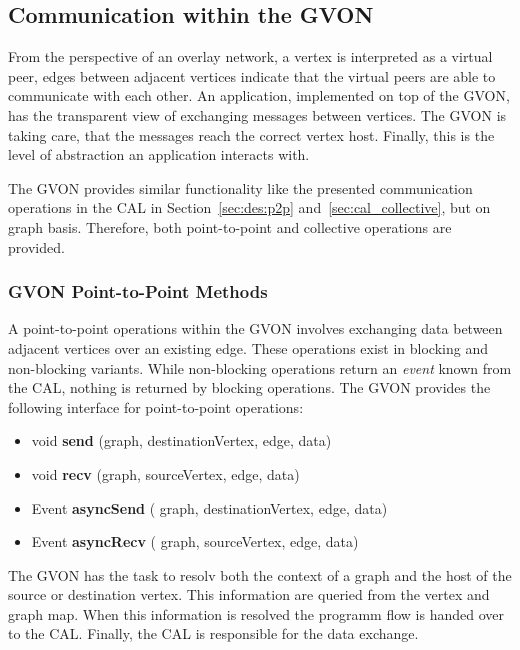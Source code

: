 \subsection{Communication within the GVON}
From the perspective of an overlay network, a vertex is interpreted as
a virtual peer, edges between adjacent vertices indicate that the
virtual peers are able to communicate with each other. An application,
implemented on top of the GVON, has the transparent view of exchanging
messages between vertices. The GVON is taking care, that the messages
reach the correct vertex host.  Finally, this is the level of
abstraction an application interacts with.

The GVON provides similar functionality like the presented
communication operations in the CAL in Section~\ref{sec:des:p2p}
and~\ref{sec:cal_collective}, but on graph basis. Therefore, both
point-to-point and collective operations are provided.

\subsubsection*{GVON Point-to-Point Methods}
A point-to-point operations within the GVON involves exchanging data
between adjacent vertices over an existing edge.  These operations
exist in blocking and non-blocking variants. While non-blocking
operations return an \emph{event} known from the CAL, nothing is returned by
blocking operations. The GVON provides the following interface for
point-to-point operations:

\begin{itemize}
  \item  void \textbf{send} (graph, destinationVertex, edge, data)
  \item  void \textbf{recv} (graph, sourceVertex, edge, data)
  \item  Event \textbf{asyncSend} ( graph, destinationVertex, edge, data)
  \item  Event \textbf{asyncRecv} ( graph, sourceVertex, edge, data)
\end{itemize}

\noindent The GVON has the task to resolv both the context of a graph
and the host of the source or destination vertex. This information are
queried from the vertex and graph map. When this information is
resolved the programm flow is handed over to the CAL. Finally, the CAL
is responsible for the data exchange.

